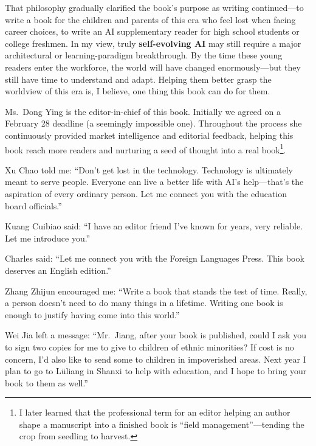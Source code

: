\vspace{1em}

That philosophy gradually clarified the book's purpose as writing continued---to write a book for the children and parents of this era who feel lost when facing career choices, to write an AI supplementary reader for high school students or college freshmen. In my view, truly \textbf{self-evolving AI} may still require a major architectural or learning-paradigm breakthrough. By the time these young readers enter the workforce, the world will have changed enormously---but they still have time to understand and adapt. Helping them better grasp the worldview of this era is, I believe, one thing this book can do for them.

\newpage
Ms.\ Dong Ying is the editor-in-chief of this book. Initially we agreed on a February 28 deadline (a seemingly impossible one). Throughout the process she continuously provided market intelligence and editorial feedback, helping this book reach more readers and nurturing a seed of thought into a real book\footnote{I later learned that the professional term for an editor helping an author shape a manuscript into a finished book is ``field management''---tending the crop from seedling to harvest.}.

\vspace{1em}

Xu Chao told me: ``Don't get lost in the technology. Technology is ultimately meant to serve people. Everyone can live a better life with AI's help---that's the aspiration of every ordinary person. Let me connect you with the education board officials.''
\vspace{1em}

Kuang Cuibiao said: ``I have an editor friend I've known for years, very reliable. Let me introduce you.''
\vspace{1em}

Charles said: ``Let me connect you with the Foreign Languages Press. This book deserves an English edition.''
\vspace{1em}

Zhang Zhijun encouraged me: ``Write a book that stands the test of time. Really, a person doesn't need to do many things in a lifetime. Writing one book is enough to justify having come into this world.''
\vspace{1em}

Wei Jia left a message: ``Mr.\ Jiang, after your book is published, could I ask you to sign two copies for me to give to children of ethnic minorities? If cost is no concern, I'd also like to send some to children in impoverished areas. Next year I plan to go to L\"{u}liang in Shanxi to help with education, and I hope to bring your book to them as well.''
\vspace{1em}

